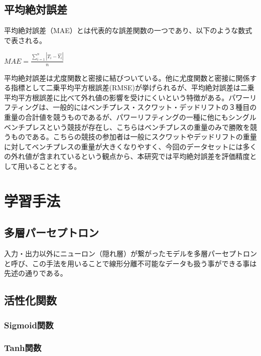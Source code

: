 \documentclass{article}
\begin{document}
\subsection{平均絶対誤差}

平均絶対誤差（MAE）とは代表的な誤差関数の一つであり、以下のような数式で表される。

\begin{center}
\begin{math}
MAE = \frac{\sum_{i=1}^{n}|T_i-\hat{Y_i}|}{n} 
\end{math}
\end{center}

平均絶対誤差は尤度関数と密接に結びついている。他に尤度関数と密接に関係する指標として二乗平均平方根誤差(RMSE)が挙げられるが、平均絶対誤差は二乗平均平方根誤差に比べて外れ値の影響を受けにくいという特徴がある。パワーリフティングは、一般的にはベンチプレス・スクワット・デッドリフトの３種目の重量の合計値を競うものであるが、パワーリフティングの一種に他にもシングルベンチプレスという競技が存在し、こちらはベンチプレスの重量のみで勝敗を競うものである。こちらの競技の参加者は一般にスクワットやデッドリフトの重量に対してベンチプレスの重量が大きくなりやすく、今回のデータセットには多くの外れ値が含まれているという観点から、本研究では平均絶対誤差を評価精度として用いることとする。


\section{学習手法}
\subsection{多層パーセプトロン}

入力・出力以外にニューロン（隠れ層）が繋がったモデルを多層パーセプトロンと呼び、この手法を用いることで線形分離不可能なデータも扱う事ができる事は先述の通りである。

\subsection{活性化関数}

\subsubsection{Sigmoid関数}

\subsubsection{Tanh関数}
\end{document}
